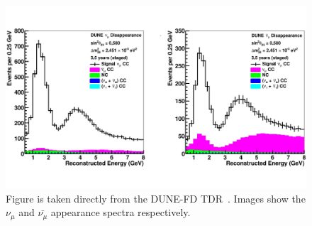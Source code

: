 \begin{figure}[]
\centering
\includegraphics[width=\textwidth]{images/tdr_muon_reconstruction_tdrv2.pdf}
\caption{Figure is taken directly from the DUNE-FD TDR~\citep{DUNE_FD_TDRv2_2020}.
Images show the $\nu_{\mu}$ and $\bar{\nu_{\mu}}$ appearance spectra respectively.
}
\end{figure}~\label{fig:muon_interaction}